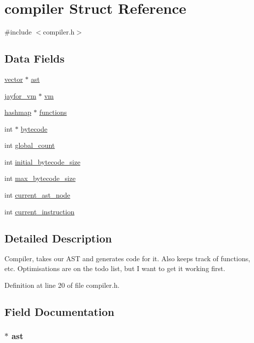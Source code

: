 \hypertarget{structcompiler}{\section{compiler Struct Reference}
\label{structcompiler}
}


{\ttfamily \#include $<$compiler.\+h$>$}

\subsection*{Data Fields}
\begin{DoxyCompactItemize}
\item 
\hyperlink{structvector}{vector} $\ast$ \hyperlink{structcompiler_a646023978cbcf99e53312df6cdd99b8f}{ast}
\item 
\hyperlink{structjayfor__vm}{jayfor\+\_\+vm} $\ast$ \hyperlink{structcompiler_a5a5f893f1b70a8fd8b043428132b4efa}{vm}
\item 
\hyperlink{structhashmap}{hashmap} $\ast$ \hyperlink{structcompiler_a06ebce769c4c96b0e3eb5ae512975adf}{functions}
\item 
int $\ast$ \hyperlink{structcompiler_a64b4be20f18afc3c774441d2fcfe6c36}{bytecode}
\item 
int \hyperlink{structcompiler_ade7224f7f710766a20379dd19924b533}{global\+\_\+count}
\item 
int \hyperlink{structcompiler_af4bc3176982d6dd4cea51d6f647040ea}{initial\+\_\+bytecode\+\_\+size}
\item 
int \hyperlink{structcompiler_aa98dd05a2e85a0bcfa6a97968f86536a}{max\+\_\+bytecode\+\_\+size}
\item 
int \hyperlink{structcompiler_a29957a44dacbb53d07ba527174855e6b}{current\+\_\+ast\+\_\+node}
\item 
int \hyperlink{structcompiler_a2b9e1ca3ba1703a588f6d160eacad1aa}{current\+\_\+instruction}
\end{DoxyCompactItemize}


\subsection{Detailed Description}
Compiler, takes our A\+S\+T and generates code for it. Also keeps track of functions, etc. Optimisations are on the todo list, but I want to get it working first. 

Definition at line 20 of file compiler.\+h.



\subsection{Field Documentation}
\hypertarget{structcompiler_a646023978cbcf99e53312df6cdd99b8f}{
\subsubsection[{ast}]{$\ast$ ast}}\label{structcompiler_a646023978cbcf99e53312df6cdd99b8f}


